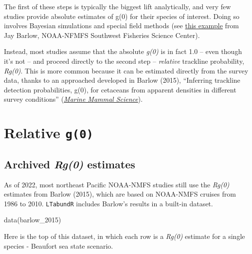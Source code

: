 \documentclass[
]{book}
\newenvironment{Shaded}{\begin{snugshade}}{\end{snugshade}}
\newcommand{\FunctionTok}[1]{\textcolor[rgb]{0.00,0.00,0.00}{#1}}
\newcommand{\NormalTok}[1]{#1}
\begin{document}
The first of these steps is typically the biggest lift analytically, and very few studies provide absolute estimates of g(0) for their species of interest. Doing so involves Bayesian simulations and special field methods (see \href{https://www.taylorfrancis.com/chapters/edit/10.1201/9781003211167-19/trackline-detection-probability-long-diving-whales-jay-barlow}{this example} from Jay Barlow, NOAA-NFMFS Southwest Fisheries Science Center).

Instead, most studies assume that the absolute \emph{g(0)} is in fact 1.0 -- even though it's not -- and proceed directly to the second step -- \emph{relative} trackline probability, \emph{Rg(0)}. This is more common because it can be estimated directly from the survey data, thanks to an approached developed in Barlow (2015), ``Inferring trackline detection probabilities, g(0), for cetaceans from apparent densities in different survey conditions'' (\href{https://onlinelibrary.wiley.com/doi/abs/10.1111/mms.12205?casa_token=BuVMa8KCgQUAAAAA:iXIQxWBCnMaWWNlNTSQ5EC2LYmodDYGHs0r-pgIPNxOCLRZzf8xXZ3vDUOlUCZRptmDsztr0Hh4}{\emph{Marine Mammal Science}}).

\hypertarget{relative-g0}{%
\section*{\texorpdfstring{Relative \texttt{g(0)}}{Relative g(0)}}\label{relative-g0}}

\hypertarget{archived-rg0-estimates}{%
\subsection*{\texorpdfstring{Archived \emph{Rg(0)} estimates}{Archived Rg(0) estimates}}\label{archived-rg0-estimates}}

As of 2022, most northeast Pacific NOAA-NMFS studies still use the \emph{Rg(0)} estimates from Barlow (2015), which are based on NOAA-NMFS cruises from 1986 to 2010. \texttt{LTabundR} includes Barlow's results in a built-in dataset.

\begin{Shaded}
\begin{Highlighting}[]
\FunctionTok{data}\NormalTok{(barlow\_2015)}
\end{Highlighting}
\end{Shaded}

Here is the top of this dataset, in which each row is a \emph{Rg(0)} estimate for a single species - Beaufort sea state scenario.
\end{document}
